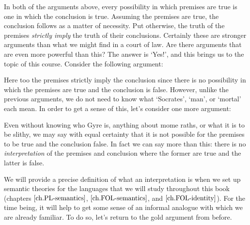\begin{earg}
\end{earg}


\begin{earg}
\end{earg}

In both of the arguments above, every possibility in which premises are true is one in which the conclusion is true.
Assuming the premises are true, the conclusion follows as a matter of necessity.
Put otherwise, the truth of the premises \emph{strictly imply} the truth of their conclusions.
Certainly these are stronger arguments than what we might find in a court of law.
Are there arguments that are even more powerful than this?
The answer is `Yes!', and this brings us to the topic of this course.
Consider the following argument:

\begin{earg}
\end{earg}

Here too the premises strictly imply the conclusion since there is no possibility in which the premises are true and the conclusion is false.
However, unlike the previous arguments, we do not need to know what `Socrates', `man', or `mortal' each mean.
In order to get a sense of this, let's consider one more argument:

\begin{earg}
\end{earg}

Even without knowing who Gyre is, anything about mome raths, or what it is to be slithy, we may say with equal certainty that it is not possible for the premises to be true and the conclusion false.
In fact we can say more than this: there is no \textit{interpretation} of the premises and conclusion where the former are true and the latter is false.

We will provide a precise definition of what an interpretation is when we set up semantic theories for the languages that we will study throughout this book (chapters $\ref{ch.PL-semantics}$, $\ref{ch.FOL-semantics}$, and $\ref{ch.FOL-identity}$).
For the time being, it will help to get some sense of an informal analogue with which we are already familiar.
To do so, let's return to the gold argument from before.

